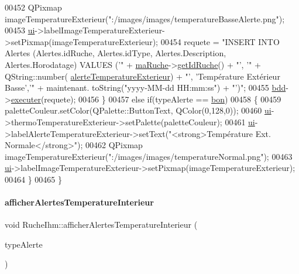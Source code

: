 \begin{DoxyCode}
00452         QPixmap imageTemperatureExterieur(\textcolor{stringliteral}{":/images/images/temperatureBasseAlerte.png"});
00453         \hyperlink{class_ruche_ihm_a64786058bd7f88ca2f1e9743bb27c25b}{ui}->labelImageTemperatureExterieur->setPixmap(imageTemperatureExterieur);
00454         requete = \textcolor{stringliteral}{"INSERT INTO Alertes (Alertes.idRuche, Alertes.idType, Alertes.Description,
       Alertes.Horodatage) VALUES ('"} + \hyperlink{class_ruche_ihm_a43a6b1fa31f4fba58d919daae3707b38}{maRuche}->\hyperlink{class_ruche_a9f2de5ef29557ec7a53d5e22df34d164}{getIdRuche}() + \textcolor{stringliteral}{"', '"} + QString::number(
      \hyperlink{parametres_8h_a83a725fd153179a2bd97afcc8307737ba300b33d38ff264e971908d263fbfd1bb}{alerteTemperatureExterieur}) + \textcolor{stringliteral}{"', 'Température Extérieur Basse','"} + maintenant.
      toString(\textcolor{stringliteral}{"yyyy-MM-dd  HH:mm:ss"}) + \textcolor{stringliteral}{"')"};
00455         \hyperlink{class_ruche_ihm_a0851936fe212e8d40538264f09749153}{bdd}->\hyperlink{class_base_de_donnees_aa8de5f8f8bb17edc43f5c0ee33712081}{executer}(requete);
00456      \}
00457      \textcolor{keywordflow}{else} \textcolor{keywordflow}{if}(typeAlerte == \hyperlink{parametres_8h_aaa6de8207c94675264c90b10b613368da5ac8ec3b54d90a07c6bb5a77ef971821}{bon})
00458      \{
00459         paletteCouleur.setColor(QPalette::ButtonText, QColor(0,128,0));
00460         \hyperlink{class_ruche_ihm_a64786058bd7f88ca2f1e9743bb27c25b}{ui}->thermoTemperatureExterieur->setPalette(paletteCouleur);
00461         \hyperlink{class_ruche_ihm_a64786058bd7f88ca2f1e9743bb27c25b}{ui}->labelAlerteTemperatureExterieur->setText(\textcolor{stringliteral}{"<strong>Température Ext. Normale</strong>"});
00462         QPixmap imageTemperatureExterieur(\textcolor{stringliteral}{":/images/images/temperatureNormal.png"});
00463         \hyperlink{class_ruche_ihm_a64786058bd7f88ca2f1e9743bb27c25b}{ui}->labelImageTemperatureExterieur->setPixmap(imageTemperatureExterieur);
00464      \}
00465 \}
\end{DoxyCode}
\mbox{\label{class_ruche_ihm_af4848134f2bc17d9772f2408a068e9d8}} 
\paragraph{\texorpdfstring{afficher\+Alertes\+Temperature\+Interieur}{afficherAlertesTemperatureInterieur}}
{\footnotesize\ttfamily void Ruche\+Ihm\+::afficher\+Alertes\+Temperature\+Interieur (\begin{DoxyParamCaption}\item[{\hyperlink{parametres_8h_aaa6de8207c94675264c90b10b613368d}{Seuils\+Alertes}}]{type\+Alerte }\end{DoxyParamCaption})\hspace{0.3cm}{\ttfamily [slot]}}




